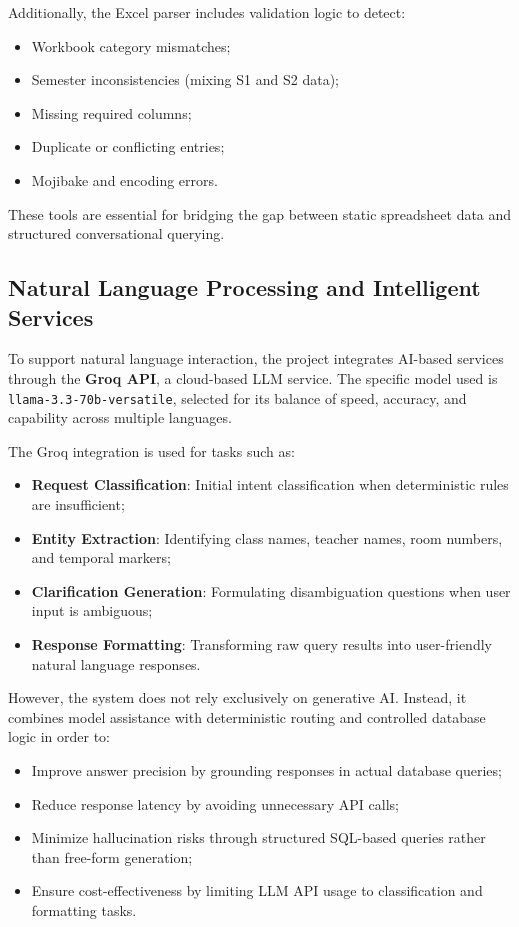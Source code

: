 Additionally, the Excel parser includes validation logic to detect:

\begin{itemize}
    \item Workbook category mismatches;
    \item Semester inconsistencies (mixing S1 and S2 data);
    \item Missing required columns;
    \item Duplicate or conflicting entries;
    \item Mojibake and encoding errors.
\end{itemize}

These tools are essential for bridging the gap between static spreadsheet data and structured conversational querying.

\subsection{Natural Language Processing and Intelligent Services}
To support natural language interaction, the project integrates AI-based services through the \textbf{Groq API}, a cloud-based LLM service. The specific model used is \texttt{llama-3.3-70b-versatile}, selected for its balance of speed, accuracy, and capability across multiple languages.

The Groq integration is used for tasks such as:

\begin{itemize}
    \item \textbf{Request Classification}: Initial intent classification when deterministic rules are insufficient;
    \item \textbf{Entity Extraction}: Identifying class names, teacher names, room numbers, and temporal markers;
    \item \textbf{Clarification Generation}: Formulating disambiguation questions when user input is ambiguous;
    \item \textbf{Response Formatting}: Transforming raw query results into user-friendly natural language responses.
\end{itemize}

However, the system does not rely exclusively on generative AI. Instead, it combines model assistance with deterministic routing and controlled database logic in order to:

\begin{itemize}
    \item Improve answer precision by grounding responses in actual database queries;
    \item Reduce response latency by avoiding unnecessary API calls;
    \item Minimize hallucination risks through structured SQL-based queries rather than free-form generation;
    \item Ensure cost-effectiveness by limiting LLM API usage to classification and formatting tasks.
\end{itemize}

